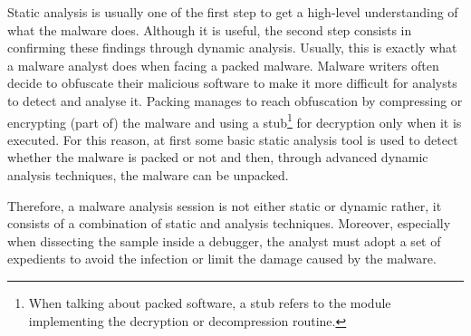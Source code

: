 \documentclass[LaM,binding=0.6cm]{sapthesis}
\begin{document}
\newpage
\noindent
Static analysis is usually one of the first step to get a high-level understanding of what the malware does. Although it is useful, the second step consists in confirming these findings through dynamic analysis. Usually, this is exactly what a malware analyst does when facing a packed malware. Malware writers often decide to obfuscate their malicious software to make it more difficult for analysts to detect and analyse it. Packing manages to reach obfuscation by compressing or encrypting (part of) the malware and using a stub\footnote{When talking about packed software, a stub refers to the module implementing the decryption or decompression routine.} for decryption only when it is executed. For this reason, at first some basic static analysis tool is used to detect whether the malware is packed or not and then, through advanced dynamic analysis techniques, the malware can be unpacked.

Therefore, a malware analysis session is not either static or dynamic rather, it consists of a combination of static and analysis techniques. Moreover, especially when dissecting the sample inside a debugger, the analyst must adopt a set of expedients to avoid the infection or limit the damage caused by the malware.
\end{document}
